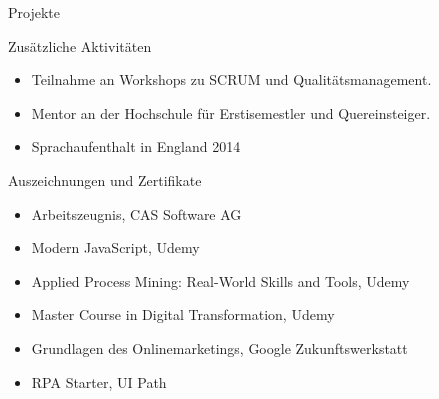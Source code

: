 \documentclass{resume} %
\begin{document}

\newpage
\begin{rSection}{Projekte}
    \vspace{0.5em}

    
    \begin{adjustwidth}{0.5cm}{}
        \vspace{-1.5em}


    \end{adjustwidth}
    
\end{rSection}


\begin{rSection}{Zusätzliche Aktivitäten}
    \begin{itemize}
        \item 	Teilnahme an Workshops zu SCRUM und Qualitätsmanagement.
        \item	Mentor an der Hochschule für Erstisemestler und Quereinsteiger.
        \item   Sprachaufenthalt in England 2014
    \end{itemize}


\end{rSection}



\begin{rSection}{Auszeichnungen und Zertifikate}
    \vspace{0.5em}

    \begin{itemize}
        \item Arbeitszeugnis, CAS Software AG
        \item Modern JavaScript, Udemy
        \item Applied Process Mining: Real-World Skills and Tools, Udemy
        \item Master Course in Digital Transformation, Udemy
        \item Grundlagen des Onlinemarketings, Google Zukunftswerkstatt
        \item RPA Starter, UI Path
    \end{itemize}


\end{rSection}
\end{document}
